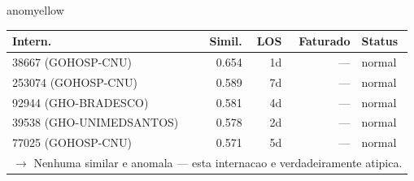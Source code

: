 \documentclass[a4paper,10pt]{article}
\begin{document}
\begin{anomalycard}[Internacao 490 | GHO-ICS | MODERADO (z=2.53)]{anomyellow}
\begin{tabular}{l r r r l}\toprule\textbf{Intern.} & \textbf{Simil.} & \textbf{LOS} & \textbf{Faturado} & \textbf{Status} \\\midrule
38667 (GOHOSP-CNU) & 0.654 & 1d & --- & \textcolor{jcubeblue}{normal} \\
253074 (GOHOSP-CNU) & 0.589 & 7d & --- & \textcolor{jcubeblue}{normal} \\
92944 (GHO-BRADESCO) & 0.581 & 4d & --- & \textcolor{jcubeblue}{normal} \\
39538 (GHO-UNIMEDSANTOS) & 0.578 & 2d & --- & \textcolor{jcubeblue}{normal} \\
77025 (GOHOSP-CNU) & 0.571 & 5d & --- & \textcolor{jcubeblue}{normal} \\
\multicolumn{5}{l}{\textcolor{jcubeblue}{\small $\rightarrow$ Nenhuma similar e anomala --- esta internacao e verdadeiramente atipica.}} \\
\bottomrule\end{tabular}


\end{anomalycard}

\newpage
\end{document}
